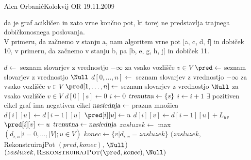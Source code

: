 \begin{naloga}{Alen Orbanić}{Kolokvij OR 19.11.2009}
\begin{odgovor}
\begin{enumerate}[(a)]
    da je graf acikličen in zato vrne končno pot, ki torej ne predstavlja trajnega
    dobičkonosnega poslovanja.  \\
    V primeru, da začnemo v stanju a, nam algoritem vrne pot [a, c, d, f] in 
    dobiček 10, v primeru, da začnemo v stanju b, pa [b, e, g, h, j] in 
    dobiček 11.
    \end{enumerate}
    \begin{slika}
    \end{slika}
    \begin{slika}
    \end{slika}
        
    \newpage
    \begin{small}
    \begin{algorithmic}
        \State $d \gets$ seznam slovarjev z vrednostjo $- \infty$ za vsako vozlišče $v \in V$
        \State $\pred \gets$ seznam slovarjev z vrednostjo $\Null$
        \State $d[0, \dots, n] \gets$ seznam slovarjev z vrednostjo $-\infty$ za vsako vozlišče $v \in V$
        \State $\pred[1, \dots, n] \gets$ seznam slovarjev z vrednostjo $\Null$
        za vsako vozlišče $v \in V$
        \State $d[0][s] \gets 0$
        \State $i \gets 0$
        \State $\text{\sl trenutna} \gets \{s\}$
            \State $i \gets i+1$
             \hfill $\exists$ pozitiven cikel
                \State \Return graf ima negativen cikel 
            \EndIf
            \State $\text{\sl{naslednja}} \gets$ prazna množica
                \State $d[i][u] \gets d[i-1][u]$
                \State $\pred[i][u] \gets u$
            \EndFor
                    \State $d[i][v] \gets d[i-1][u] +  L_{uv}$
                    \State $\pred[i][v] \gets u$
                \EndIf
            \EndFor
            \State $\text{\sl{trenutna}} \gets \text{\sl{naslednja}}$
        \EndWhile
        \State $zasluzek \gets$ max $({d_{i,u} |i=0, \ldots , |V|;  u \in V})$
        \State $konec \gets \{v | d_{i,v}= zasluzek \}$
        \State \Return $(zasluzek,$ RekonstruirajPot $(pred,konec)$, $\Null$)
        \State \Return $(zasluzek, \text{\sc RekonstruirajPot}(\pred, \text{\sl konec}), \Null)$
    \EndFunction
    \end{algorithmic}

\end{small}
\end{odgovor}
\end{naloga}
